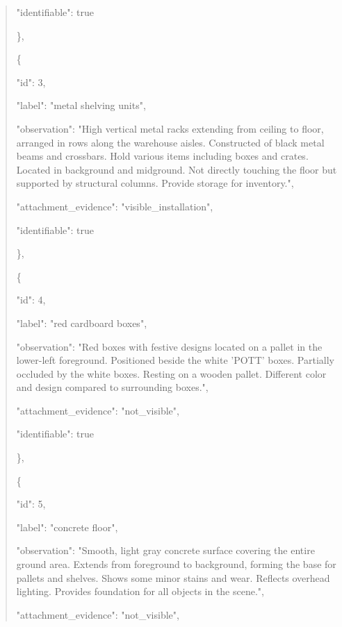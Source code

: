 \documentclass[10pt,a4paper]{article}
\begin{document}
\begin{quote}
      "identifiable":\allowbreak{} true\par
    \},\allowbreak{}\par
    \{\par
      "id":\allowbreak{} 3,\allowbreak{}\par
      "label":\allowbreak{} "metal shelving units",\allowbreak{}\par
      "observation":\allowbreak{} "High vertical metal racks extending from ceiling to floor,\allowbreak{} arranged in rows along the warehouse aisles. Constructed of black metal beams and crossbars. Hold various items including boxes and crates. Located in background and midground. Not directly touching the floor but supported by structural columns. Provide storage for inventory.",\allowbreak{}\par
      "attachment\_evidence":\allowbreak{} "visible\_installation",\allowbreak{}\par
      "identifiable":\allowbreak{} true\par
    \},\allowbreak{}\par
    \{\par
      "id":\allowbreak{} 4,\allowbreak{}\par
      "label":\allowbreak{} "red cardboard boxes",\allowbreak{}\par
      "observation":\allowbreak{} "Red boxes with festive designs located on a pallet in the lower-left foreground. Positioned beside the white 'POTT' boxes. Partially occluded by the white boxes. Resting on a wooden pallet. Different color and design compared to surrounding boxes.",\allowbreak{}\par
      "attachment\_evidence":\allowbreak{} "not\_visible",\allowbreak{}\par
      "identifiable":\allowbreak{} true\par
    \},\allowbreak{}\par
    \{\par
      "id":\allowbreak{} 5,\allowbreak{}\par
      "label":\allowbreak{} "concrete floor",\allowbreak{}\par
      "observation":\allowbreak{} "Smooth,\allowbreak{} light gray concrete surface covering the entire ground area. Extends from foreground to background,\allowbreak{} forming the base for pallets and shelves. Shows some minor stains and wear. Reflects overhead lighting. Provides foundation for all objects in the scene.",\allowbreak{}\par
      "attachment\_evidence":\allowbreak{} "not\_visible",\allowbreak{}\par

\end{quote}
\end{document}
